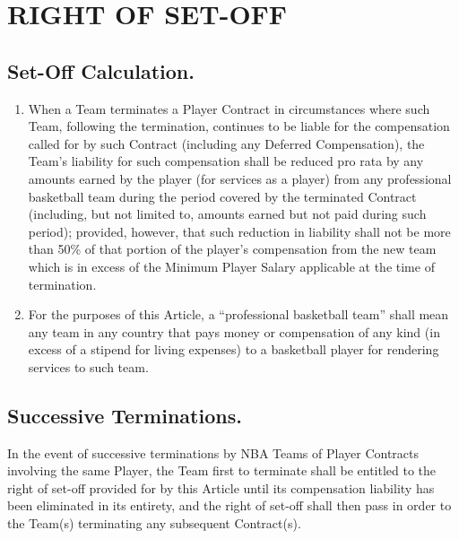 \documentclass[
]{book}
\providecommand{\tightlist}{%
  \setlength{\itemsep}{0pt}\setlength{\parskip}{0pt}}
\begin{document}
\hypertarget{right-of-set-off}{%
\chapter{RIGHT OF SET-OFF}\label{right-of-set-off}}

\hypertarget{set-off-calculation.}{%
\section{Set-Off Calculation.}\label{set-off-calculation.}}

\begin{enumerate}
\def\labelenumi{(\alph{enumi})}
\tightlist
\item
  When a Team terminates a Player Contract in circumstances where such Team, following the termination, continues to be liable for the compensation called for by such Contract (including any Deferred Compensation), the Team's liability for such compensation shall be reduced pro rata by any amounts earned by the player (for services as a player) from any professional basketball team during the period covered by the terminated Contract (including, but not limited to, amounts earned but not paid during such period); provided, however, that such reduction in liability shall not be more than 50\% of that portion of the player's compensation from the new team which is in excess of the Minimum Player Salary applicable at the time of termination.
\item
  For the purposes of this Article, a ``professional basketball team'' shall mean any team in any country that pays money or compensation of any kind (in excess of a stipend for living expenses) to a basketball player for rendering services to such team.
\end{enumerate}

\hypertarget{successive-terminations.}{%
\section{Successive Terminations.}\label{successive-terminations.}}

In the event of successive terminations by NBA Teams of Player Contracts involving the same Player, the Team first to terminate shall be entitled to the right of set-off provided for by this Article until its compensation liability has been eliminated in its entirety, and the right of set-off shall then pass in order to the Team(s) terminating any subsequent Contract(s).
\end{document}
